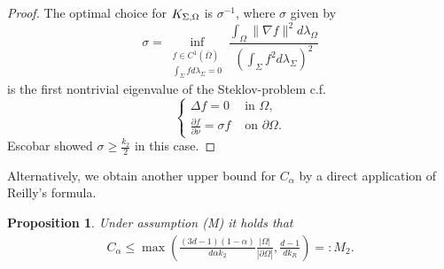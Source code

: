 \documentclass[a4paper]{article}
\newtheorem{proposition}[theorem]{Proposition}
\theoremstyle{definition}
\numberwithin{equation}{section}
\begin{document}
\begin{proof} The optimal choice for $K_{\Sigma,\Omega}$ is $\sigma^{-1}$, where $\sigma$ given by
\[
\sigma=\inf_{\substack {f \in C^1(\overline \Omega)\\ \int_\Sigma f d \lambda_\Sigma=0  }}  \frac{\int_\Omega \| \nabla f \|^2 d\lambda_\Omega}{\left( \int_\Sigma f^2 d \lambda_\Sigma  \right)^2}\]
is the first nontrivial eigenvalue of the Steklov-problem  c.f.\ \cite{MR3662010}
\begin{equation*}
\begin{cases}
 \Delta f = 0 &  \mbox{ in } \Omega, \\
 \frac{\partial f}{\partial \nu} = \sigma f & \mbox{ on } \partial \Omega.
    \end{cases}\end{equation*}
Escobar \cite{escobar}  showed  $\sigma \geq \frac {k_2} 2 $ in this case.
\end{proof}

Alternatively, we obtain another upper bound for $C_\alpha$ by a direct application of  Reilly's formula.

\begin{proposition}
Under assumption (M) it holds that 
\begin{align}
    \label{def_M2}
    C_\alpha \leq \max\left(\frac{(3d-1)(1-\alpha) }{d\alpha k_2}\frac{|\Omega|}{|\partial \Omega |}, \frac{d-1}{d k_R}\right)=:M_2.
\end{align}
\end{proposition}
\end{document}
